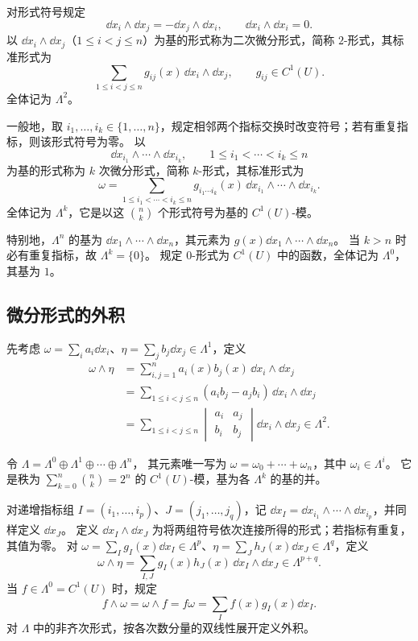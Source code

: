 \begin{definition}[高次微分形式]
对形式符号规定
\[
\dd x_i\wedge\dd x_j=-\dd x_j\wedge\dd x_i,\qquad
\dd x_i\wedge\dd x_i=0.
\]
以 $\dd x_i\wedge\dd x_j$（$1\le i<j\le n$）为基的形式称为二次微分形式，简称 $2$-形式，其标准形式为
\[
\sum_{1\le i<j\le n}g_{ij}(x)\,\dd x_i\wedge\dd x_j,
\qquad g_{ij}\in C^1(U).
\]
全体记为 $\Lambda^2$。

一般地，取 $i_1,\ldots,i_k\in\{1,\ldots,n\}$，规定相邻两个指标交换时改变符号；若有重复指标，则该形式符号为零。
以
\[
\dd x_{i_1}\wedge\cdots\wedge\dd x_{i_k},
\qquad 1\le i_1<\cdots<i_k\le n
\]
为基的形式称为 $k$ 次微分形式，简称 $k$-形式，其标准形式为
\[
\omega=\sum_{1\le i_1<\cdots<i_k\le n}
g_{i_1\cdots i_k}(x)\,\dd x_{i_1}\wedge\cdots\wedge\dd x_{i_k}.
\]
全体记为 $\Lambda^k$，它是以这 $\binom nk$ 个形式符号为基的 $C^1(U)$-模。
\end{definition}

特别地，$\Lambda^n$ 的基为 $\dd x_1\wedge\cdots\wedge\dd x_n$，其元素为 $g(x)\dd x_1\wedge\cdots\wedge\dd x_n$。
当 $k>n$ 时必有重复指标，故 $\Lambda^k=\{0\}$。
规定 $0$-形式为 $C^1(U)$ 中的函数，全体记为 $\Lambda^0$，其基为 $1$。

\subsection*{微分形式的外积}

\begin{definition}[外积]
先考虑 $\omega=\sum_i a_i\dd x_i$、$\eta=\sum_j b_j\dd x_j\in\Lambda^1$，定义
\[
\begin{aligned}
\omega\wedge\eta
&=\sum_{i,j=1}^n a_i(x)b_j(x)\,\dd x_i\wedge\dd x_j\\
&=\sum_{1\le i<j\le n}(a_i b_j-a_j b_i)\,\dd x_i\wedge\dd x_j\\
&=\sum_{1\le i<j\le n}\begin{vmatrix}a_i&a_j\\b_i&b_j\end{vmatrix}
\dd x_i\wedge\dd x_j\in\Lambda^2.
\end{aligned}
\]

令 $\Lambda=\Lambda^0\oplus\Lambda^1\oplus\cdots\oplus\Lambda^n$，
其元素唯一写为 $\omega=\omega_0+\cdots+\omega_n$，其中 $\omega_i\in\Lambda^i$。
它是秩为 $\sum\limits_{k=0}^n\binom nk=2^n$ 的 $C^1(U)$-模，基为各 $\Lambda^k$ 的基的并。

对递增指标组 $I=(i_1,\ldots,i_p)$、$J=(j_1,\ldots,j_q)$，记
$\dd x_I=\dd x_{i_1}\wedge\cdots\wedge\dd x_{i_p}$，并同样定义 $\dd x_J$。
定义 $\dd x_I\wedge\dd x_J$ 为将两组符号依次连接所得的形式；若指标有重复，其值为零。
对 $\omega=\sum_Ig_I(x)\dd x_I\in\Lambda^p$、$\eta=\sum_Jh_J(x)\dd x_J\in\Lambda^q$，定义
\[
\omega\wedge\eta=\sum_{I,J}g_I(x)h_J(x)\,\dd x_I\wedge\dd x_J\in\Lambda^{p+q}.
\]
当 $f\in\Lambda^0=C^1(U)$ 时，规定
\[
f\wedge\omega=\omega\wedge f=f\omega=\sum_I f(x)g_I(x)\dd x_I.
\]
对 $\Lambda$ 中的非齐次形式，按各次数分量的双线性展开定义外积。
\end{definition}

